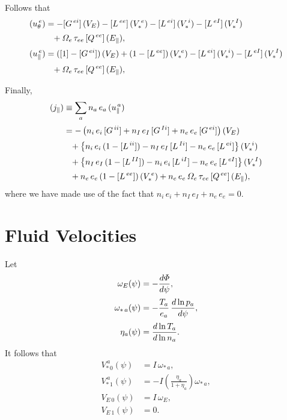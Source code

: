 \documentclass[12pt]{article}
\begin{document}
Follows that
\begin{align}
(u_\theta^{\,e}) &=-[G^{\,ei}]\,(V_E)-[L^{\,ee}]\,(V_{\ast}^{\,e})- [L^{\,ei}]\,(V_{\ast}^{\,i}) -[L^{\,eI}]\,(V_\ast^{\,I}) 
\nonumber\\[0.5ex]
&\phantom{=}+ {\mit\Omega}_e\,\tau_{ee}\,[Q^{\,ee}]\,(E_\parallel),\\[0.5ex]
(u_\parallel^{\,e}) &= ([1]-[G^{\,ei}])\,(V_E) + (1-[L^{\,ee}])\,(V_{\ast}^{\,e}) - [L^{\,ei}]\,(V_{\ast}^{\,i}) -[L^{\,eI}]\,(V_\ast^{\,I})\nonumber\\[0.5ex]&\phantom{=}
+ {\mit\Omega}_e\,\tau_{ee}\,[Q^{\,ee}]\,(E_\parallel),
\end{align}

Finally,
\begin{align}
(j_\parallel) &\equiv \sum_a n_a\,e_a\,(u_\parallel^{\,a})\nonumber\\[0.5ex]
&=-\left(n_i\,e_i\,[G^{\,ii}]+n_I\,e_I\,[G^{\,Ii}]+n_e\,e_e\,[G^{\,ei}]\right)(V_E)
\nonumber\\[0.5ex]
&\phantom{=}+\left\{n_i\,e_i\,(1-[L^{\,ii}]) - n_I\,e_I\,[L^{\,Ii}] - n_e\,e_e\,[L^{\,ei}]\right\}(V_\ast^{\,i})\nonumber\\[0.5ex]
&\phantom{=}+\left\{n_I\,e_I\,(1-[L^{\,II}]) - n_i\,e_i\,[L^{\,iI}]-n_e\,e_e\,[L^{\,eI}]\right\}(V_\ast^{\,I})\nonumber\\[0.5ex]
&\phantom{=}+n_e\,e_e\,(1-[L^{\,ee}])\,(V_\ast^{\,e}) +n_e\,e_e\,{\mit\Omega}_e\,\tau_{ee}\,[Q^{\,ee}]\,(E_\parallel),
\end{align}
where we have made use of the fact that $n_i\,e_i+n_I\,e_I+n_e\,e_e=0$. 

\section{Fluid Velocities}
Let
\begin{align}
\omega_E(\psi) &=-\frac{d{\mit\Phi}}{d\psi},\\[0.5ex]
\omega_{\ast\,a}(\psi) &= -\frac{T_a}{e_a}\,\frac{d\ln p_a}{d\psi},\\[0.5ex]
\eta_a(\psi) &= \frac{d\ln T_a}{d\ln n_a}.
\end{align}
It follows that
\begin{align}
V_{\ast\,0}^{\,a}(\psi)&= I\,\omega_{\ast\,a},\\[0.5ex]
V_{\ast\,1}^{\,a}(\psi) &=-I\left(\frac{\eta_a}{1+\eta_a}\right)\omega_{\ast\,a},\\[0.5ex]
V_{E\,0}(\psi)&= I\,\omega_{E},\\[0.5ex]
V_{E\,1}(\psi) &=0.
\end{align}
\end{document}
